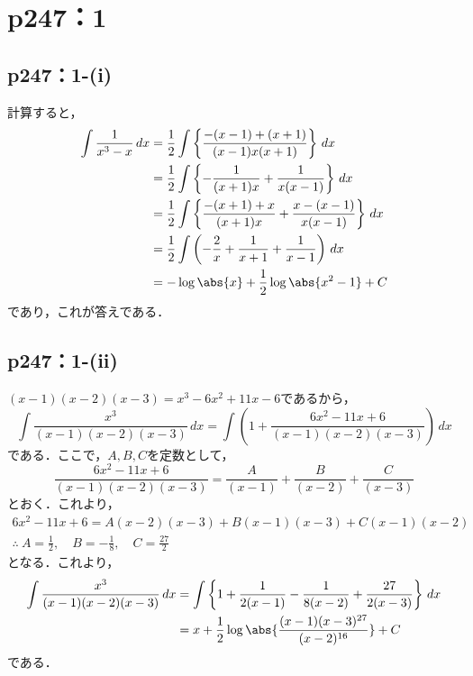 \documentclass[a4paper,10pt,fleqn]{ltjsarticle}
\begin{document}
\section*{p247：1}


\subsection*{p247：1-(i)}

\begin{tleftbar}
    計算すると，
    \begin{align*}
        \int \frac{1}{x^3-x} \, dx & = \frac{1}{2} \int \left \{ \frac{-(x-1)+(x+1)}{(x-1)x(x+1)} \right \} \, dx \\
        & = \frac{1}{2} \int \left \{ -\frac{1}{(x+1)x}+\frac{1}{x(x-1)} \right \} \, dx \\
        & = \frac{1}{2} \int \left \{ \frac{-(x+1)+x}{(x+1)x} + \frac{x-(x-1)}{x(x-1)} \right \} \, dx \\
        & = \frac{1}{2} \int \left ( -\frac{2}{x}+\frac{1}{x+1}+\frac{1}{x-1} \right) \, dx \\
        & = -\log \abs{x} + \frac{1}{2} \log \abs{x^2-1}+ C
    \end{align*}
    であり，これが答えである．
\end{tleftbar}


\subsection*{p247：1-(ii)}

\begin{tleftbar}
    $(x-1)(x-2)(x-3)=x^3 -6x^2+11x-6$であるから，
    \[
        \int \frac{x^3}{(x-1)(x-2)(x-3)} \, dx  = \int \left (1+ \frac{6x^2-11x+6}{(x-1)(x-2)(x-3)}\right) \, dx
    \]
    である．ここで，$A,B,C$を定数として，
    \[
        \frac{6x^2-11x+6}{(x-1)(x-2)(x-3)} = \frac{A}{(x-1)}+\frac{B}{(x-2)}+\frac{C}{(x-3)}
    \]
    とおく．これより，
    \begin{gather*}
        6x^2-11x+6 = A(x-2)(x-3)+B (x-1)(x-3)+C(x-1)(x-2) \\
        \therefore ~ A = \frac{1}{2}, \quad B = -\frac{1}{8},\quad C= \frac{27}{2}
    \end{gather*}
    となる．これより，
    \begin{align*}
        \int \frac{x^3}{(x-1)(x-2)(x-3)} \, dx & = \int \left \{ 1+ \frac{1}{2(x-1)} - \frac{1}{8(x-2)}+\frac{27}{2(x-3)} \right \} \, dx  \\
        & = x + \frac{1}{2} \log \abs{\frac{(x-1)(x-3)^{27}}{(x-2)^{16}}}+C
    \end{align*}
    である．
\end{tleftbar}
\end{document}
